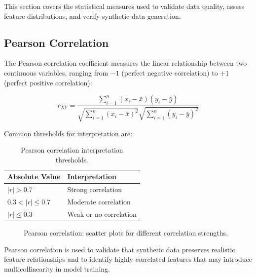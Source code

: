 \documentclass[10pt,a4paper]{article}
\begin{document}
This section covers the statistical measures used to validate data quality, assess feature distributions, and verify synthetic data generation.

\subsection{Pearson Correlation}
\label{sec:pearson-correlation}

The Pearson correlation coefficient measures the linear relationship between two continuous variables, ranging from $-1$ (perfect negative correlation) to $+1$ (perfect positive correlation):

\begin{equation}
r_{XY} = \frac{\sum_{i=1}^{n}(x_i - \bar{x})(y_i - \bar{y})}{\sqrt{\sum_{i=1}^{n}(x_i - \bar{x})^2} \sqrt{\sum_{i=1}^{n}(y_i - \bar{y})^2}}
\label{eq:pearson}
\end{equation}

Common thresholds for interpretation are:

\begin{table}[H]
\centering
\caption{Pearson correlation interpretation thresholds.}
\label{tab:correlation-thresholds}
\begin{tabular}{ll}
\toprule
\textbf{Absolute Value} & \textbf{Interpretation} \\
\midrule
$|r| > 0.7$ & Strong correlation \\
$0.3 < |r| \leq 0.7$ & Moderate correlation \\
$|r| \leq 0.3$ & Weak or no correlation \\
\bottomrule
\end{tabular}
\end{table}

\begin{figure}[H]
    \centering
    \caption{Pearson correlation: scatter plots for different correlation strengths.}
    \label{fig:correlation-scatter}
\end{figure}

Pearson correlation is used to validate that synthetic data preserves realistic feature relationships and to identify highly correlated features that may introduce multicollinearity in model training.
\end{document}
